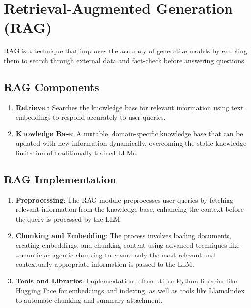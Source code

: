 \documentclass[
  letterpaper,
  DIV=11,
  numbers=noendperiod]{scrartcl}
\begin{document}
\section{Retrieval-Augmented Generation
(RAG)}\label{retrieval-augmented-generation-rag}

RAG is a technique that improves the accuracy of generative models by
enabling them to search through external data and fact-check before
answering questions.

\subsection{RAG Components}\label{rag-components}

\begin{enumerate}
\def\labelenumi{\arabic{enumi}.}
\item
  \textbf{Retriever}: Searches the knowledge base for relevant
  information using text embeddings to respond accurately to user
  queries.
\item
  \textbf{Knowledge Base}: A mutable, domain-specific knowledge base
  that can be updated with new information dynamically, overcoming the
  static knowledge limitation of traditionally trained LLMs.
\end{enumerate}

\subsection{RAG Implementation}\label{rag-implementation}

\begin{enumerate}
\def\labelenumi{\arabic{enumi}.}
\item
  \textbf{Preprocessing}: The RAG module preprocesses user queries by
  fetching relevant information from the knowledge base, enhancing the
  context before the query is processed by the LLM.
\item
  \textbf{Chunking and Embedding}: The process involves loading
  documents, creating embeddings, and chunking content using advanced
  techniques like semantic or agentic chunking to ensure only the most
  relevant and contextually appropriate information is passed to the
  LLM.
\item
  \textbf{Tools and Libraries}: Implementations often utilise Python
  libraries like Hugging Face for embeddings and indexing, as well as
  tools like LlamaIndex to automate chunking and summary attachment.
\end{enumerate}
\end{document}
